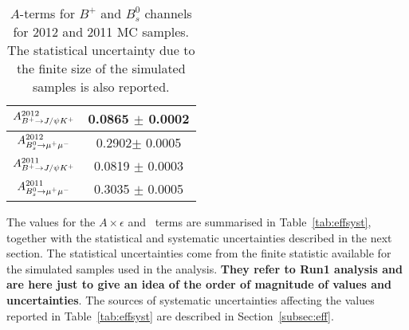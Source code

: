 \begin{table}[htbp]
\begin{center}
\begin{tabular}{|c|c|}
\hline
$A_{B^+ \to J/\psi K^+}^{2012}$ & 0.0865 $\pm$ 0.0002 \\
\hline
$A_{B_s^0 \to \mu^+\mu^-}^{2012}$ & 0.2902$\pm$ 0.0005 \\
\hline
$A_{B^+ \to J/\psi K^+}^{2011}$ & 0.0819 $\pm$ 0.0003 \\
\hline
$A_{B_s^0 \to \mu^+\mu^-}^{2011}$ & 0.3035 $\pm$ 0.0005 \\
\hline
\end{tabular}
\caption{\label{tab:Aterm}$A$-terms for $B^+$ and $B^0_s$ channels for 2012
and 2011 MC samples. The statistical uncertainty due to the finite size
of the simulated samples is also reported.} 
\end{center}
\end{table}

The values for the $A \times \epsilon$ and \theRho\ terms are summarised in
Table~\ref{tab:effsyst}, together with the statistical and systematic
uncertainties described in the next section. The statistical uncertainties
come from the finite statistic available for the simulated samples used
in the analysis. \textbf{They refer to Run1 analysis and are here just to give an idea of the order of magnitude of values and uncertainties}.
The sources of systematic uncertainties affecting the values reported in
Table~\ref{tab:effsyst} are described in Section~\ref{subsec:eff}.

